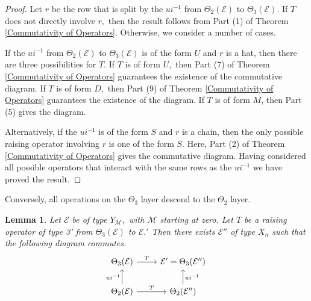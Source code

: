 \documentclass[11pt,letterpaper]{amsart}
\newcommand{\EE}{\mathcal{E}}
\newtheorem{lemma}[thm]{Lemma}
\numberwithin{equation}{section}
\begin{document}
\begin{proof}
    Let $r$ be the row that is split by the $ui^{-1}$ from $\Theta_2(\EE)$ to $\Theta_3(\EE).$ If $T$ does not directly involve $r,$ then the result follows from Part (1) of Theorem \ref{Commutativity of Operators}. Otherwise, we consider a number of cases.

    If the $ui^{-1}$ from $\Theta_2(\EE)$ to $\Theta_3(\EE)$ is of the form $U$ and $r$ is a hat, then there are three possibilities for $T$. If $T$ is of form $U,$ then Part (7) of Theorem \ref{Commutativity of Operators} guarantees the existence of the commutative diagram. If $T$ is of form $D,$ then Part (9) of Theorem \ref{Commutativity of Operators} guarantees the existence of the diagram. If $T$ is of form $M$, then Part (5) gives the diagram.

    

    Alternatively, if the $ui^{-1}$ is of the form $S$ and $r$ is a chain, then the only possible raising operator involving $r$ is one of the form $S.$ Here, Part (2) of Theorem \ref{Commutativity of Operators} gives the commutative diagram. Having considered all possible operators that interact with the same rows as the $ui^{-1}$ we have proved the result.
\end{proof}

Conversely, all operations on the $\Theta_3$ layer descend to the $\Theta_2$ layer.

\begin{lemma}
\label{commute 3 to 2}
    Let $\EE$ be of type $Y_\mathcal{M},$ with $\mathcal{M}$ starting at zero. Let $T$ be a raising operator of type 3' from $\Theta_3(\EE)$ to $\EE.'$ Then there exists $\EE''$ of type $X_n$ such that the following diagram commutes.
\[\begin{tikzcd}
	{\Theta_3(\EE)} & {\EE' = \Theta_3(\EE'')} \\
	{\Theta_2(\EE)} & {\Theta_2(\EE'')}
	\arrow["T", from=1-1, to=1-2]
	\arrow["{ui^{-1}}", from=2-1, to=1-1]
	\arrow["T", from=2-1, to=2-2]
	\arrow["{ui^{-1}}"', from=2-2, to=1-2]
\end{tikzcd}\]
\end{lemma}
\end{document}
